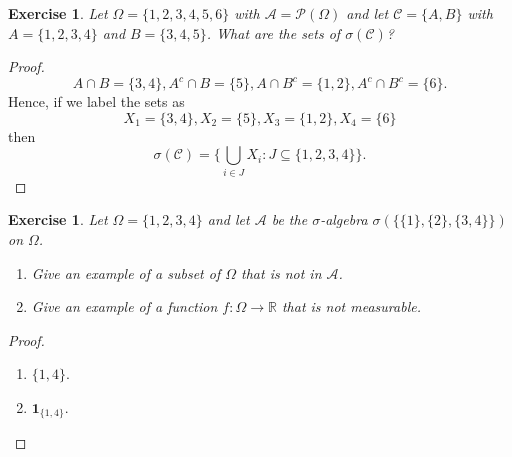 \documentclass{article}
\newtheorem{exercise}[theorem]{Exercise}
\begin{document}
\begin{exercise}
Let $\Omega=\{1,2,3,4,5,6\}$ with $\mathcal{A}=\mathcal{P}(\Omega)$ and let $\mathcal{C}=\{A,B\}$ with $A=\{1,2,3,4\}$ and $B=\{3,4,5\}$. What are the sets of $\sigma(\mathcal{C})$?
\end{exercise}
\begin{proof}
\[A\cap B=\{3,4\},A^c\cap B=\{5\},A\cap B^c=\{1,2\},A^c\cap B^c=\{6\}.\]
Hence, if we label the sets as \[X_1=\{3,4\},X_2=\{5\},X_3=\{1,2\},X_4=\{6\}\] then\[\sigma(\mathcal{C})=\{\bigcup_{i\in J}X_i:J\subseteq\{1,2,3,4\}\}.\]
\end{proof}

\begin{exercise}
Let $\Omega=\{1,2,3,4\}$ and let $\mathcal{A}$ be the $\sigma$-algebra $\sigma(\{\{1\},\{2\},\{3,4\}\})$ on $\Omega$.
\begin{enumerate}
    \item[(a)] Give an example of a subset of $\Omega$ that is not in $\mathcal{A}$.
    \item[(b)] Give an example of a function $f:\Omega\to\mathbb{R}$ that is not measurable.
\end{enumerate}
\end{exercise}
\begin{proof}
\begin{enumerate}
    \item[(a)] $\{1,4\}$.
    \item[(b)] $\mathbf{1}_{\{1,4\}}$.
\end{enumerate}
\end{proof}
\end{document}

